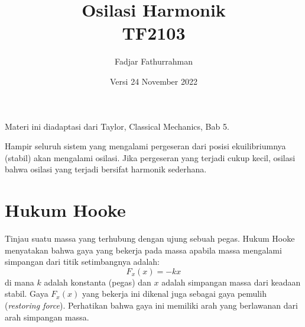 




\title{Osilasi Harmonik \\
TF2103}
\author{Fadjar Fathurrahman}
\date{Versi 24 November 2022}
\maketitle

Materi ini diadaptasi dari Taylor, Classical Mechanics, Bab 5.

Hampir seluruh sistem yang mengalami pergeseran dari posisi ekuilibriumnya
(stabil) akan mengalami osilasi.
Jika pergeseran yang terjadi cukup kecil, osilasi
bahwa osilasi yang terjadi bersifat harmonik sederhana.

\section{Hukum Hooke}

Tinjau suatu massa yang terhubung dengan ujung sebuah pegas. Hukum Hooke menyatakan
bahwa gaya yang bekerja pada massa apabila massa mengalami simpangan dari titik
setimbangnya adalah:
\begin{equation}
F_{x}(x) = -kx
\end{equation}
di mana $k$ adalah konstanta (pegas) dan $x$ adalah simpangan massa dari keadaan stabil.
Gaya $F_x(x)$ yang bekerja ini dikenal juga sebagai gaya pemulih (\textit{restoring force}).
Perhatikan bahwa gaya ini memiliki arah yang berlawanan dari arah simpangan massa.

